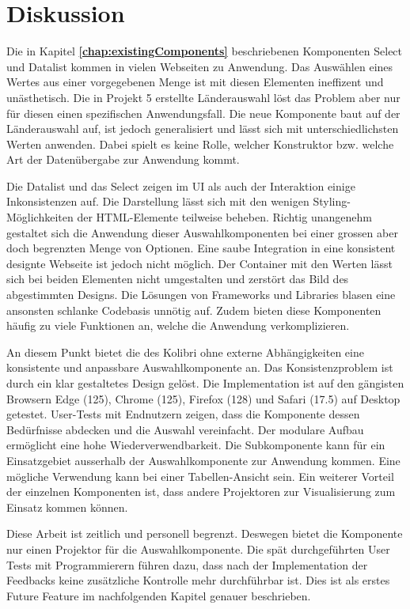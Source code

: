 \chapter{Diskussion}
\label{chap:discussion}

Die in Kapitel \textbf{\ref{chap:existingComponents}} beschriebenen Komponenten Select und Datalist kommen in vielen Webseiten zu Anwendung. 
Das Auswählen eines Wertes aus einer vorgegebenen Menge ist mit diesen Elementen ineffizent und unästhetisch. 
Die in Projekt 5 erstellte Länderauswahl löst das Problem aber nur für diesen einen spezifischen Anwendungsfall. 
Die neue Komponente  baut auf der Länderauswahl auf, ist jedoch generalisiert und lässt sich mit unterschiedlichsten Werten anwenden. 
Dabei spielt es keine Rolle, welcher Konstruktor bzw. welche Art der Datenübergabe zur Anwendung kommt. 

Die Datalist und das Select zeigen im UI als auch der Interaktion einige Inkonsistenzen auf. 
Die Darstellung lässt sich mit den wenigen Styling-Möglichkeiten der HTML-Elemente teilweise beheben. 
Richtig unangenehm gestaltet sich die Anwendung dieser Auswahlkomponenten bei einer grossen aber doch begrenzten Menge von Optionen. 
Eine saube Integration in eine konsistent designte Webseite ist jedoch nicht möglich. 
Der Container mit den Werten lässt sich bei beiden Elementen nicht umgestalten und zerstört das Bild des abgestimmten Designs. 
Die Lösungen von Frameworks und Libraries blasen eine ansonsten schlanke Codebasis unnötig auf. 
Zudem bieten diese Komponenten häufig zu viele Funktionen an, welche die Anwendung verkomplizieren. 

An diesem Punkt bietet die  des Kolibri ohne externe Abhängigkeiten eine konsistente und anpassbare Auswahlkomponente an. 
Das Konsistenzproblem ist durch ein klar gestaltetes Design gelöst. 
Die Implementation ist auf den gängisten Browsern Edge (125), Chrome (125), Firefox (128) und Safari (17.5) auf Desktop getestet. 
User-Tests mit Endnutzern zeigen, dass die Komponente dessen Bedürfnisse abdecken und die Auswahl vereinfacht. 
Der modulare Aufbau ermöglicht eine hohe Wiederverwendbarkeit. 
Die Subkomponente  kann für ein Einsatzgebiet ausserhalb der Auswahlkomponente zur Anwendung kommen. 
Eine mögliche Verwendung kann bei einer Tabellen-Ansicht sein. 
Ein weiterer Vorteil der einzelnen Komponenten ist, dass andere Projektoren zur Visualisierung zum Einsatz kommen können. 

Diese Arbeit ist zeitlich und personell begrenzt. 
Deswegen bietet die Komponente nur einen Projektor für die Auswahlkomponente. 
Die spät durchgeführten User Tests mit Programmierern führen dazu, dass nach der Implementation der Feedbacks keine zusätzliche Kontrolle mehr durchführbar ist. 
Dies ist als erstes Future Feature im nachfolgenden Kapitel genauer beschrieben. 


